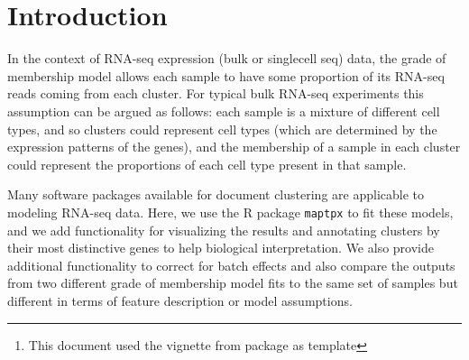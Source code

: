 \documentclass[12pt]{article}\usepackage[]{graphicx}\usepackage[usenames,dvipsnames]{color}
\author{Kushal K Dey, Chiaowen Joyce Hsiao \& Matthew Stephens \\[1em] \small{\textit{Stephens Lab}, The University of Chicago} \mbox{ }\\ \small{\texttt{$^*$Correspondending Email: mstephens@uchicago.edu}}}
\newcommand{\CountClust}{\textit{CountClust}}
\begin{document}
\maketitle

\begin{abstract}
  \vspace{1em}
 Grade of membership or GoM models (also known as admixture models or Latent Dirichlet Allocation") are a generalization of cluster models that allow each sample to have membership in multiple clusters. It is widely used to model ancestry of individuals in population genetics based on SNP/ microsatellite data and also in natural language processing for modeling documents \cite{Pritchard2000, Blei2003}.

This \R{} package implements tools to visualize the clusters obtained from fitting topic models using a Structure plot \cite{Rosenberg2002} and extract the top features/genes that distinguish the clusters. In presence of known technical or batch effects, the package also allows for correction of these confounding effects.

\vspace{1em}
\textbf{\CountClust{} version:} 0.1.0 \footnote{This document used the vignette from \Bioconductor{} package  as  template}
\end{abstract}




\newpage

\tableofcontents

\section{Introduction}

In the context of RNA-seq expression (bulk or singlecell seq) data, the grade of membership model allows each sample to have some proportion of its RNA-seq reads coming from each cluster. For typical bulk RNA-seq experiments this assumption
can be argued as follows: each sample is a mixture of different cell types, and so clusters could represent cell types (which are determined by the expression patterns of the genes), and the membership of a sample in each cluster could represent the proportions of each cell type present in that sample.

Many software packages available for document clustering are applicable to modeling RNA-seq data. Here, we use the R package {\tt maptpx} \cite{Taddy2012} to fit these models, and we add functionality for visualizing the results and annotating clusters by their most distinctive genes to help biological interpretation. We also provide additional functionality to correct for batch effects and also compare the outputs from two different grade of membership model fits to the same set of samples but different in terms of feature description or model assumptions.
\end{document}
